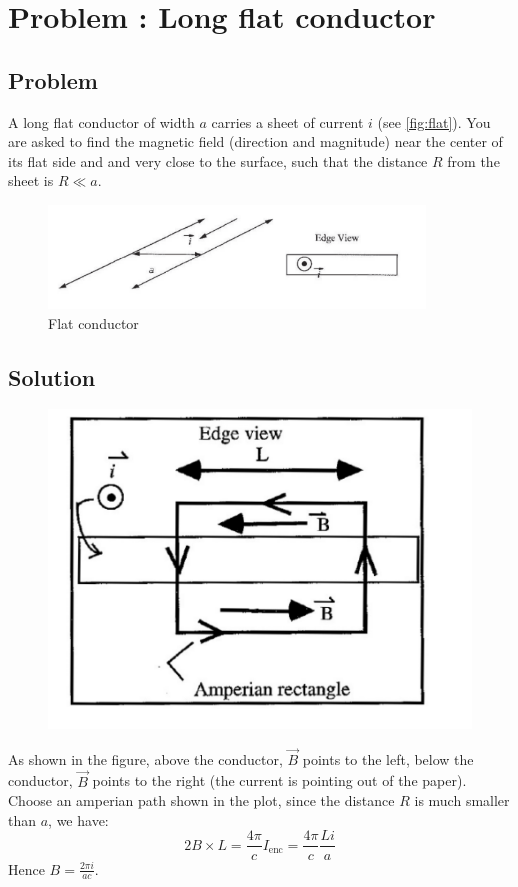\documentclass[solutions]{esg8022pset}
\date{\today }
\begin{document}
\section{Problem \thesection: Long flat conductor}
\subsection{Problem}
  A long flat conductor of width $a$ carries a sheet of current $i$ (see
  \autoref{fig:flat}). You are asked to find the magnetic field (direction and
  magnitude) near the center of its flat side and and very close to the
  surface, such that the distance $R$ from the sheet is $R \ll a$.

  \begin{figure}[H]
    \centering
    \includegraphics[width = 10cm]{flat_conductor}
    \caption{Flat conductor}
    \label{fig:flat}
  \end{figure}
\subsection{Solution}
  \begin{figure}[H]
    \centering
    \includegraphics[width = 12cm]{flat_conductor_sol}
  \end{figure}

  As shown in the figure, above the conductor, $\vec{B}$ points to the left,
  below the conductor, $\vec{B}$  points to the right (the current is pointing
  out of the paper).  Choose an amperian path shown in the plot, since the
  distance $R$ is much smaller than $a$, we have:
  \begin{equation}
    2B \times L = \frac{4 \pi}{c} I_{\text{enc}} = \frac{4 \pi}{c} \frac{L i}{a}
  \end{equation}
  Hence $B=\frac{2 \pi i}{a c}$.
\end{document}
